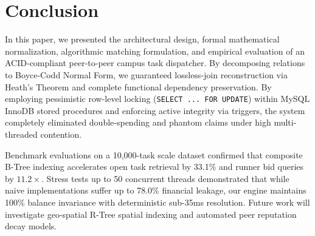 \documentclass[conference]{IEEEtran}
\begin{document}
\section{Conclusion}
In this paper, we presented the architectural design, formal mathematical normalization, algorithmic matching formulation, and empirical evaluation of an ACID-compliant peer-to-peer campus task dispatcher. By decomposing relations to Boyce-Codd Normal Form, we guaranteed lossless-join reconstruction via Heath's Theorem and complete functional dependency preservation. By employing pessimistic row-level locking (\texttt{SELECT ... FOR UPDATE}) within MySQL InnoDB stored procedures and enforcing active integrity via triggers, the system completely eliminated double-spending and phantom claims under high multi-threaded contention. 

Benchmark evaluations on a 10,000-task scale dataset confirmed that composite B-Tree indexing accelerates open task retrieval by 33.1\% and runner bid queries by $11.2\times$. Stress tests up to 50 concurrent threads demonstrated that while naive implementations suffer up to 78.0\% financial leakage, our engine maintains 100\% balance invariance with deterministic sub-35ms resolution. Future work will investigate geo-spatial R-Tree spatial indexing and automated peer reputation decay models.
\end{document}
